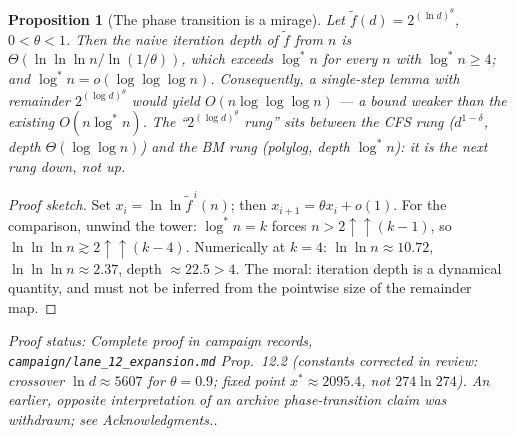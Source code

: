 \documentclass[a4paper,11pt]{amsart}
\newtheorem{proposition}[theorem]{Proposition}
\theoremstyle{definition}
\theoremstyle{remark}
\newcommand{\proofsrc}[1]{\par\smallskip\noindent\begin{sloppypar}\small\emph{Proof status: #1.}\end{sloppypar}\par\smallskip}
\begin{document}
\begin{proposition}[The phase transition is a mirage]\label{prop:mirage}
Let $\tilde f(d)=2^{(\ln d)^{\theta}}$, $0<\theta<1$. Then the naive iteration depth of $\tilde f$ from $n$
is $\Theta(\ln\ln\ln n/\ln(1/\theta))$, which exceeds $\log^* n$ for every $n$ with $\log^*n\ge4$; and
$\log^*n=o(\log\log\log n)$. Consequently, a single-step lemma with remainder $2^{(\log d)^\theta}$ would
yield $O(n\log\log\log n)$ --- a bound \emph{weaker} than the existing $O(n\log^* n)$. The
``$2^{(\log d)^\theta}$ rung'' sits \emph{between} the CFS rung ($d^{1-\delta}$, depth
$\Theta(\log\log n)$) and the BM rung (polylog, depth $\log^* n$): it is the next rung down, not up.
\end{proposition}
\begin{proof}[Proof sketch]
Set $x_i=\ln\ln\tilde f^{\,i}(n)$; then $x_{i+1}=\theta x_i+o(1)$. For the comparison, unwind the tower:
$\log^*n=k$ forces $n>2\uparrow\uparrow(k-1)$, so $\ln\ln\ln n\gtrsim 2\uparrow\uparrow(k-4)$. Numerically
at $k=4$: $\ln\ln n\approx10.72$, $\ln\ln\ln n\approx2.37$, depth $\approx22.5>4$. The moral: iteration
depth is a dynamical quantity, and must not be inferred from the pointwise size of the remainder map.
\end{proof}
\proofsrc{Complete proof in campaign records, \texttt{campaign/lane\_12\_expansion.md} Prop.~12.2 (constants
corrected in review: crossover $\ln d\approx5607$ for $\theta=0.9$; fixed point $x^*\approx2095.4$, not
$274\ln274$). An earlier, opposite interpretation of an archive phase-transition claim was withdrawn; see
Acknowledgments.}
\end{document}
